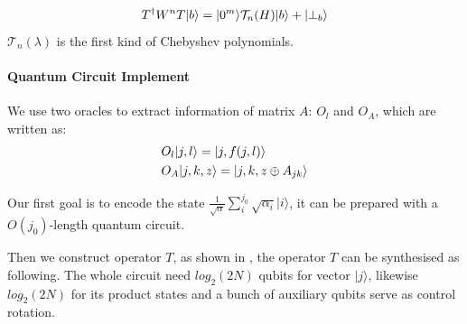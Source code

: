 \documentclass[%
 reprint,
 amsmath,amssymb,
pra,
]{revtex4-1}
\begin{document}
\begin{equation}
T^{\dagger}W^nT|b\rangle=|0^m\rangle\mathcal{T}_n(H)|b\rangle+|\bot_b\rangle\notag
\end{equation}
$\mathcal{T}_n(\lambda)$ is the first kind of Chebyshev polynomials.

\paragraph{Quantum Circuit Implement}
We use two oracles to extract information of matrix $A$: $O_l$ and $O_A$, which are written as:
\begin{align}
&O_l|j,l\rangle=|j,f(j,l)\rangle\notag\\
&O_A|j,k,z\rangle=|j,k,z\oplus A_{jk}\rangle\notag
\end{align}


Our first goal is to encode the state $\frac{1}
{\sqrt{\alpha}}\sum_i^{j_0}\sqrt{\alpha_i}|i\rangle$, it can be prepared with a $O(j_0)$-length quantum circuit.

Then we construct operator $T$, as shown in \cite{7354428}, the operator $T$ can be synthesised as following.
The whole circuit need $log_2(2N)$ qubits for vector $|j\rangle$, likewise 
$log_2(2N)$ for its product states and a bunch of auxiliary qubits serve as 
control rotation.
\end{document}
